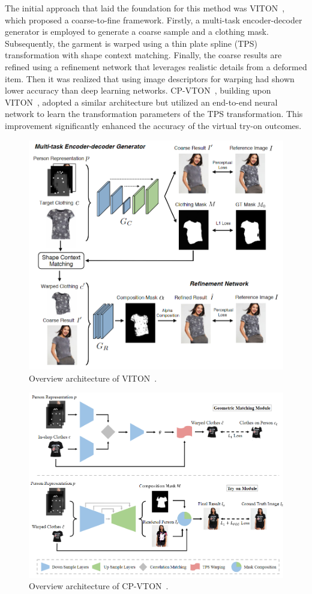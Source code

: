 The initial approach that laid the foundation for this method was VITON~\cite{Han-CVPR2018-Viton}, which proposed a coarse-to-fine framework. Firstly, a multi-task encoder-decoder generator is employed to generate a coarse sample and a clothing mask. Subsequently, the garment is warped using a thin plate spline (TPS) transformation with shape context matching. Finally, the coarse results are refined using a refinement network that leverages realistic details from a deformed item. Then it was realized that using image descriptors for warping had shown lower accuracy than deep learning networks. CP-VTON~\cite{Wang-ECCV2018-Toward}, building upon VITON~\cite{Han-CVPR2018-Viton}, adopted a similar architecture but utilized an end-to-end neural network to learn the transformation parameters of the TPS transformation. This improvement significantly enhanced the accuracy of the virtual try-on outcomes. 

\begin{figure}[h!]
    \centering
    \includegraphics[width=0.7\linewidth]{content/resources/images/literature-review/viton.png}
    \caption{Overview architecture of VITON~\cite{Han-CVPR2018-Viton}.}
    \label{vton-viton}
\end{figure}

\begin{figure}[h!]
    \centering
    \includegraphics[width=0.85\linewidth]{content/resources/images/literature-review/cp-vton.png}
    \caption{Overview architecture of CP-VTON~\cite{Wang-ECCV2018-Toward}.}
    \label{vton-cpvton}
\end{figure}

